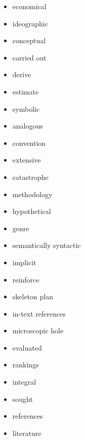 \documentclass[a4paper,10pt]{article}
\theoremstyle{discussion_style} \newtheorem{discussion}{\color{red}{Discussion point}}
\theoremstyle{theorem_style} \newtheorem{theorem}{Theorem}
\begin{document}
\newpage
\begin{itemize}
\item economical
\item ideographic
\item conceptual
 \item carried out
\item derive 
\item estimate
\item symbolic
 \item analogous
\item convention
\item extensive
\item catastrophe
\item methodology
\item hypothetical
\item genre
\item semantically syntactic
\item implicit
\item reinforce
\item skeleton plan
\item in-text references
\item microscopic hole
\item evaluated
\item rankings
\item integral
\item sought
\item references
\item literature
\end{itemize}
\end{document}
